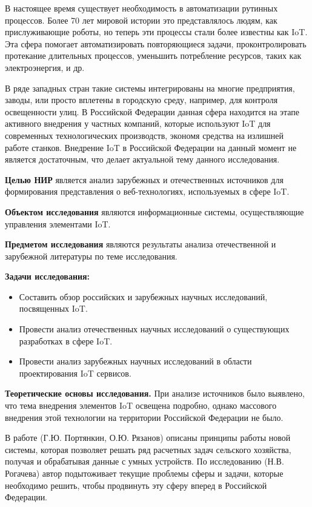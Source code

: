 
В настоящее время существует необходимость в автоматизации рутинных процессов. Более 70 лет мировой истории это представлялось людям, как прислуживающие роботы, но теперь эти процессы стали более известны как IoT.   Эта сфера помогает автоматизировать повторяющиеся задачи, проконтролировать протекание длительных процессов, уменьшить потребление ресурсов, таких как электроэнергия, и др.

В ряде западных стран такие системы интегрированы на многие предприятия, заводы, или просто вплетены в городскую среду, например, для контроля освещенности улиц. В Российской Федерации данная сфера находится на этапе активного внедрения у частных компаний, которые используют IoT для современных технологических производств, экономя средства на излишней работе станков. Внедрение IoT в Российской Федерации на данный момент не является достаточным, что делает актуальной тему данного исследования.

\textbf{Целью НИР} является анализ зарубежных и отечественных источников для формирования представления о веб-технологиях, используемых в сфере IoT.

\textbf{Объектом исследования} являются информационные системы, осуществляющие управления элементами IoT.

\textbf{Предметом исследования} являются результаты анализа отечественной и зарубежной литературы по теме исследования.

\textbf{Задачи исследования:}


\begin{itemize}
  \item Составить обзор российских и зарубежных научных исследований, посвященных IoT.
  \item Провести анализ отечественных научных исследований о существующих разработках в сфере IoT.
  \item Провести анализ зарубежных научных исследований в области проектирования IoT сервисов.
\end{itemize}


\textbf{Теоретические основы исследования.}	При анализе источников было выявлено, что тема внедрения элементов IoT освещена подробно, однако массового внедрения этой технологии на территории Российской Федерации не было.

В работе (Г.Ю. Портянкин, О.Ю. Рязанов) описаны принципы работы новой системы, которая позволяет решать ряд расчетных задач сельского хозяйства, получая и обрабатывая данные с умных устройств. По исследованию (Н.В. Рогачева) автор подытоживает текущие проблемы сферы и задачи, которые необходимо решить, чтобы продвинуть эту сферу вперед в Российской Федерации.

